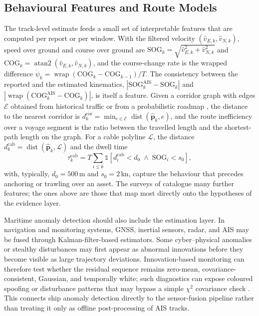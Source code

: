 \documentclass[graybox,envcountchap]{style/SNmono}
\begin{document}
\subsection{Behavioural Features and Route Models}
\label{subsec:maritime-features}
The track-level estimate feeds a small set of interpretable features that are computed per report or per window. With the filtered velocity $(\hat v_{E,k},\hat v_{N,k})$, speed over ground and course over ground are $\mathrm{SOG}_k=\sqrt{\hat v_{E,k}^{2}+\hat v_{N,k}^{2}}$ and $\mathrm{COG}_k=\operatorname{atan2}(\hat v_{E,k},\hat v_{N,k})$, and the course-change rate is the wrapped difference $\dot\psi_k=\operatorname{wrap}(\mathrm{COG}_k-\mathrm{COG}_{k-1})/T$. The consistency between the reported and the estimated kinematics, $|\mathrm{SOG}^{\mathrm{AIS}}_k-\mathrm{SOG}_k|$ and $|\operatorname{wrap}(\mathrm{COG}^{\mathrm{AIS}}_k-\mathrm{COG}_k)|$, is itself a feature. Given a corridor graph with edges $\mathcal{E}$ obtained from historical traffic or from a probabilistic roadmap \cite{pallotta_tread_2013,oliva_tomei_prm_access_2026}, the distance to the nearest corridor is $d^{\mathrm{cor}}_k=\min_{e\in\mathcal{E}}\operatorname{dist}(\hat{\mathbf{p}}_k,e)$, and the route inefficiency over a voyage segment is the ratio between the travelled length and the shortest-path length on the graph. For a cable polyline $\mathcal{L}$, the distance $d^{\mathrm{cab}}_k=\operatorname{dist}(\hat{\mathbf{p}}_k,\mathcal{L})$ and the dwell time
\begin{equation}
\tau^{\mathrm{cab}}_k=T\sum_{i\le k}\mathbb{1}\!\left[d^{\mathrm{cab}}_i<d_0\;\wedge\;\mathrm{SOG}_i<s_0\right],
\label{eq:ch07-dwell}
\end{equation}
with, typically, $d_0=500$\,m and $s_0=2$\,kn, capture the behaviour that precedes anchoring or trawling over an asset. The surveys of \cite{riveiro_review_2018,wolsing_anomaly_2022} catalogue many further features; the ones above are those that map most directly onto the hypotheses of the evidence layer.


Maritime anomaly detection should also include the estimation layer. In navigation and monitoring systems, GNSS, inertial sensors, radar, and AIS may be fused through Kalman-filter-based estimators. Some cyber--physical anomalies or stealthy disturbances may first appear as abnormal innovations before they become visible as large trajectory deviations. Innovation-based monitoring can therefore test whether the residual sequence remains zero-mean, covariance-consistent, Gaussian, and temporally white; such diagnostics can expose coloured spoofing or disturbance patterns that may bypass a simple \(\chi^2\) covariance check \cite{oliva_innovation_2026}. This connects ship anomaly detection directly to the sensor-fusion pipeline rather than treating it only as offline post-processing of AIS tracks.
\end{document}
